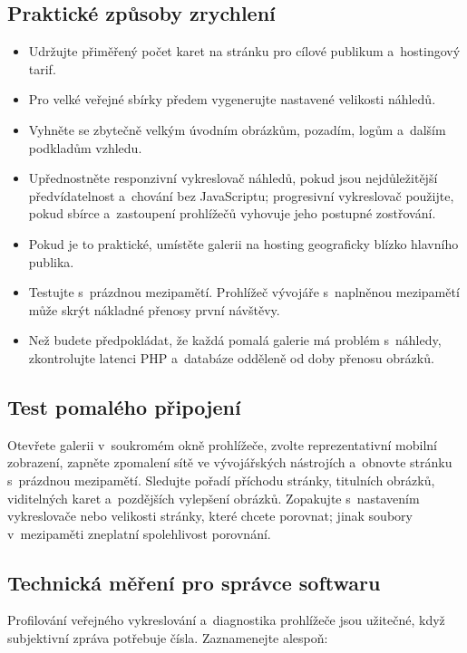 \documentclass[11pt,a4paper]{article}
\begin{document}
\subsection{Praktické způsoby zrychlení}

\begin{itemize}
  \item Udržujte přiměřený počet karet na stránku pro cílové publikum
  a~hostingový tarif.
  \item Pro velké veřejné sbírky předem vygenerujte nastavené velikosti náhledů.
  \item Vyhněte se zbytečně velkým úvodním obrázkům, pozadím, logům a~dalším
  podkladům vzhledu.
  \item Upřednostněte responzivní vykreslovač náhledů, pokud jsou nejdůležitější
  předvídatelnost a~chování bez JavaScriptu; progresivní vykreslovač použijte,
  pokud sbírce a~zastoupení prohlížečů vyhovuje jeho postupné zostřování.
  \item Pokud je to praktické, umístěte galerii na hosting geograficky blízko
  hlavního publika.
  \item Testujte s~prázdnou mezipamětí. Prohlížeč vývojáře s~naplněnou
  mezipamětí může skrýt nákladné přenosy první návštěvy.
  \item Než budete předpokládat, že každá pomalá galerie má problém s~náhledy,
  zkontrolujte latenci PHP a~databáze odděleně od doby přenosu obrázků.
\end{itemize}

\subsection{Test pomalého připojení}

Otevřete galerii v~soukromém okně prohlížeče, zvolte reprezentativní mobilní
zobrazení, zapněte zpomalení sítě ve vývojářských nástrojích a~obnovte stránku
s~prázdnou mezipamětí. Sledujte pořadí příchodu stránky, titulních obrázků,
viditelných karet a~pozdějších vylepšení obrázků. Zopakujte s~nastavením
vykreslovače nebo velikosti stránky, které chcete porovnat; jinak soubory
v~mezipaměti zneplatní spolehlivost porovnání.

\subsection{Technická měření pro správce softwaru}

Profilování veřejného vykreslování a~diagnostika prohlížeče jsou užitečné, když
subjektivní zpráva potřebuje čísla. Zaznamenejte alespoň:
\end{document}
